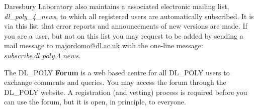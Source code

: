 \noindent
Daresbury Laboratory also maintains a \D associated electronic mailing
list, {\em dl\_poly\_4\_news}, to which all registered \D users
are automatically subscribed.  It is via this list that error reports
and announcements of new versions are made.  If you are a \D
user, but not on this list you may request to be added by sending
a mail message to {\href{mailto:majordomo@dl.ac.uk}{majordomo@dl.ac.uk}}
with the one-line message: $subscribe~dl\_poly\_4\_news$.

The DL\_POLY {\bf Forum} is a web based centre for all DL\_POLY users
to exchange comments and queries.  You may access the forum through the
DL\_POLY website.  A registration (and vetting) process is required
before you can use the forum, but it is open, in principle, to everyone.
